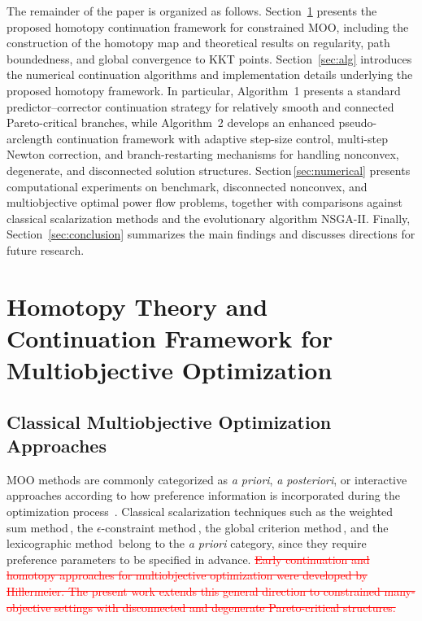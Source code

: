 \documentclass[11pt,pdflatex,sn-mathphys-ay]{sn-jnl}%
\theoremstyle{definition}
\theoremstyle{thmstyleone}%
\theoremstyle{thmstyletwo}%
\theoremstyle{thmstylethree}%
\newcommand{\del}[1]{\textcolor{red}{\sout{#1}}}
\begin{document}
	
	The remainder of the paper is organized as follows. Section~\ref{sec:related} presents the proposed homotopy continuation framework for constrained MOO, including the construction of the homotopy map and theoretical results on regularity, path boundedness, and global convergence to KKT points. Section~\ref{sec:alg} introduces the numerical continuation algorithms and implementation details underlying the proposed homotopy framework. In particular, Algorithm~1 presents a standard predictor--corrector continuation strategy for relatively smooth and connected Pareto-critical branches, while Algorithm~2 develops an enhanced pseudo-arclength continuation framework with adaptive step-size control, multi-step Newton correction, and branch-restarting mechanisms for handling nonconvex, degenerate, and disconnected solution structures. Section\,\ref{sec:numerical} presents computational experiments on benchmark, disconnected nonconvex, and multiobjective optimal power flow problems, together with comparisons against classical scalarization methods and the evolutionary algorithm NSGA-II. Finally, Section~\ref{sec:conclusion} summarizes the main findings and discusses directions for future research.
	
	
	\section{Homotopy Theory and Continuation Framework for Multiobjective Optimization} 
	\label{sec:related}
	
	\subsection{Classical Multiobjective Optimization Approaches}
	MOO methods are commonly categorized as \textit{a priori}, \textit{a posteriori}, or interactive approaches according to how preference information is incorporated during the optimization process~\cite{miettinen1999nonlinear,coello2006evolutionary}. Classical scalarization techniques such as the weighted sum method\,\cite{marler2004survey, van2012evaluation,gass1955computational}, the $\epsilon$-constraint method\,\cite{haimes1971bicriterion}, the global criterion method\,\cite{marler2004survey}, and the lexicographic method\,\cite{isermann1982linear, miettinen1999nonlinear, ehrgott2005multicriteria} belong to the \textit{a priori} category, since they require preference parameters to be specified in advance. 
	\del{Early continuation and homotopy approaches for multiobjective optimization were developed by Hillermeier. 
		The present work extends this general direction to constrained many-objective settings with disconnected and degenerate Pareto-critical structures.} 
	
\end{document}
